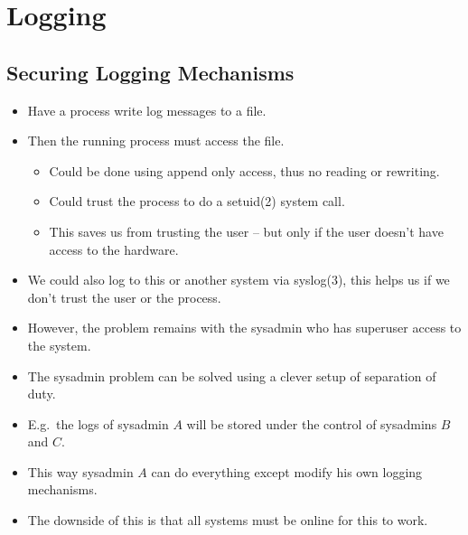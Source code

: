 \section{Logging}

\subsection{Securing Logging Mechanisms}

\begin{frame}
  \begin{itemize}
    \item Have a process write log messages to a file.

    \item Then the running process must access the file.
      \begin{itemize}
        \item Could be done using append only access, thus no reading or 
          rewriting.

        \item Could trust the process to do a setuid(2) system call.

        \item This saves us from trusting the user -- but only if the user 
          doesn't have access to the hardware.

      \end{itemize}

    \item We could also log to this or another system via syslog(3), this helps 
      us if we don't trust the user or the process.

    \item However, the problem remains with the sysadmin who has superuser 
      access to the system.

  \end{itemize}
\end{frame}

\begin{frame}
  \begin{itemize}
    \item The sysadmin problem can be solved using a clever setup of separation 
      of duty.

    \item E.g.\ the logs of sysadmin \(A\) will be stored under the control of 
      sysadmins \(B\) and \(C\).

    \item This way sysadmin \(A\) can do everything except modify his own 
      logging mechanisms.

    \item The downside of this is that all systems must be online for this to 
      work.

  \end{itemize}
\end{frame}

